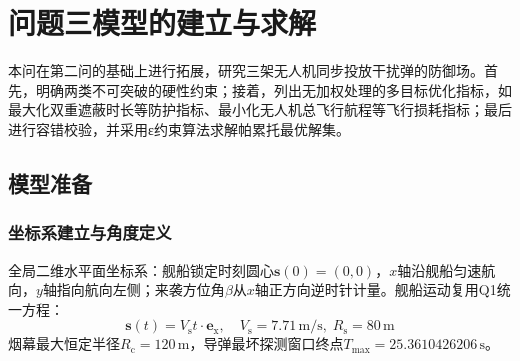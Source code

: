 \documentclass[withoutpreface,bwprint]{cumcmthesis}
\begin{document}




\section{问题三模型的建立与求解}

本问在第二问的基础上进行拓展，研究三架无人机同步投放干扰弹的防御场。首先，明确两类不可突破的硬性约束；接着，列出无加权处理的多目标优化指标，如最大化双重遮蔽时长等防护指标、最小化无人机总飞行航程等飞行损耗指标；最后进行容错校验，并采用ε约束算法求解帕累托最优解集。


\subsection{模型准备}
\subsubsection{坐标系建立与角度定义}
全局二维水平面坐标系：舰船锁定时刻圆心$\bm{s}(0)=(0,0)$，$x$轴沿舰船匀速航向，$y$轴指向航向左侧；来袭方位角$\beta$从$x$轴正方向逆时针计量。舰船运动复用Q1统一方程：
\[\bm{s}(t) = V_{\mathrm{s}} t \cdot\bm{e}_{\mathrm{x}},\quad V_{\mathrm{s}}=7.71\,\text{m/s},\;R_{\mathrm{s}}=80\,\text{m}\]
烟幕最大恒定半径$R_{\mathrm{c}}=120\,\text{m}$，导弹最坏探测窗口终点$T_{\max}=25.3610426206\,\text{s}$。
\end{document}
